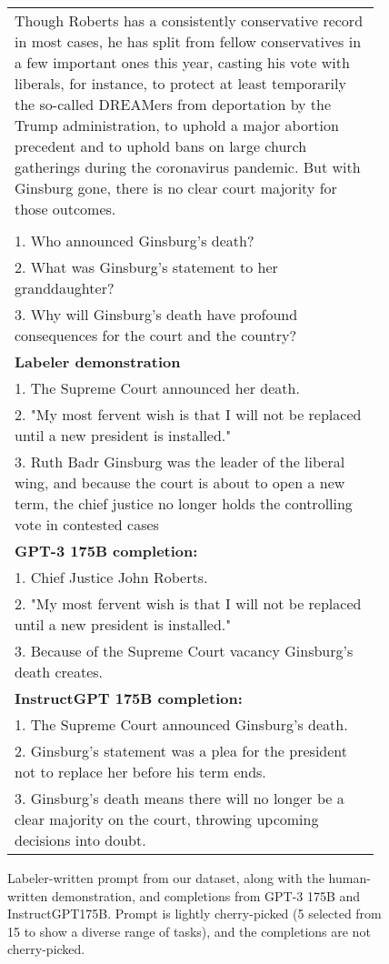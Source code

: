 \begin{figure}[hp]
\begin{tabular}{p{0.95\linewidth}}
Though Roberts has a consistently conservative record in most cases, he has split from fellow conservatives in a few important ones this year, casting his vote with liberals, for instance, to protect at least temporarily the so-called DREAMers from deportation by the Trump administration, to uphold a major abortion precedent and to uphold bans on large church gatherings during the coronavirus pandemic. But with Ginsburg gone, there is no clear court majority for those outcomes.\\\\
1. Who announced Ginsburg's death?\\
2. What was Ginsburg's statement to her granddaughter?\\
3. Why will Ginsburg's death have profound consequences for the court and the country?\\
\midrule
\textbf{Labeler demonstration}\\ 
1. The Supreme Court announced her death. \\
2. "My most fervent wish is that I will not be replaced until a new president is installed." \\
3. Ruth Badr Ginsburg was the leader of the liberal wing, and because the court is about to open a new term, the chief justice no longer holds the controlling vote in contested cases\\
\midrule 
        \textbf{GPT-3 175B completion:} \\
        1. Chief Justice John Roberts.\\
2. "My most fervent wish is that I will not be replaced until a new president is installed."\\
3. Because of the Supreme Court vacancy Ginsburg's death creates.\\
\midrule 
\textbf{InstructGPT 175B completion:} \\
1. The Supreme Court announced Ginsburg's death. \\
2. Ginsburg's statement was a plea for the president not to replace her before his term ends. \\
3. Ginsburg's death means there will no longer be a clear majority on the court, throwing upcoming decisions into doubt.\\
\bottomrule
    \end{tabular}
    \caption{Labeler-written prompt from our dataset, along with the human-written demonstration, and completions from GPT-3 175B and InstructGPT175B. Prompt is lightly cherry-picked (5 selected from 15 to show a diverse range of tasks), and the completions are not cherry-picked.}
    \label{fig:qual_labeler_3}
\end{figure}


